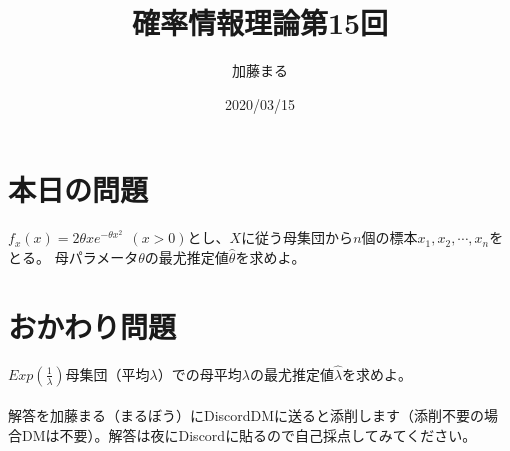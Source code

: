 \documentclass[a4j,uplatex,dvipdfmx]{jsarticle}
\title{確率情報理論第15回}
\author{加藤まる}
\date{2020/03/15}
\begin{document}
\maketitle

\section*{本日の問題}
$f_x(x)=2\theta x e^{-\theta x^2}~~(x>0)$とし、$X$に従う母集団から$n$個の標本$x_1,x_2,\cdots , x_n$をとる。
母パラメータ$\theta$の最尤推定値$\hat{\theta}$を求めよ。


\section*{おかわり問題}
$Exp(\frac{1}{\lambda})$母集団（平均$\lambda$）での母平均$\lambda$の最尤推定値$\hat{\lambda}$を求めよ。
\\ \\

解答を加藤まる（まるぼう）にDiscordDMに送ると添削します（添削不要の場合DMは不要）。解答は夜にDiscordに貼るので自己採点してみてください。
\end{document}
